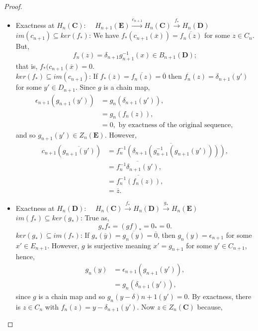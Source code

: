 \documentclass[11.5pt, twoside, a4paper, titlepage]{report}
\theoremstyle{definition}
\theoremstyle{plain}
\begin{document}
\begin{proof}
\begin{itemize}
\item Exactness at $H_n(\mathbf{C})$: $\quad H_{n+1}(\mathbf{E}) \xrightarrow{c_{n+1}} H_n(\mathbf{C})\xrightarrow{f_{\ast}}H_n(\mathbf{D})$\\
$im(c_{n+1})\subseteq ker(f_{\ast})$: We have $f_{\ast}(c_{n+1}(\overline{x}))=\overline{f_n(z)}$ for some $z\in C_n$. But,
\begin{equation*}
f_n(z)=\delta_{n+1}g^{-1}_{n+1}(x)\in B_{n+1}(\mathbf{D});
\end{equation*}
that is, $f_{\ast}(c_{n+1}(\overline{x})=0$.\\
$ker(f_{\ast})\subseteq im(c_{n+1})$: If $f_{\ast}(\overline{z})=\overline{f_n(z)}=\overline{0}$ then $f_n(z)=\delta_{n+1}(y')$ for some $y'\in D_{n+1}$. Since $g$ is a chain map,
\begin{align*}
\epsilon_{n+1}(g_{n+1}(y'))&=g_n(\delta_{n+1}(y')),\\
&=g_n(f_n(z)),\\
&=0, \text{ by exactness of the original sequence, }
\end{align*}
and so $g_{n+1}(y')\in Z_n(\mathbf{E})$. However,
\begin{align*}
c_{n+1}(\overline{g_{n+1}(y')})&=\overline{f^{-1}_n(\delta_{n+1}(g^{-1}_{n+1}(g_{n+1}(y'))))}, \\
&=\overline{f_n^{-1}\delta_{n+1}(y')}, \\
&=\overline{f_n^{-1}(f_n(z))}, \\
&=\overline{z}.
\end{align*}
\item Exactness at $H_n(\mathbf{D})$: $\quad H_n(\mathbf{C}) \xrightarrow{f_{\ast}} H_n(\mathbf{D}) \xrightarrow{g_{\ast}} H_n(\mathbf{E})$\\
$im(f_{\ast}) \subseteq ker(g_{\ast})$: True as,
\begin{equation*}
g_{\ast}f_{\ast}=(gf)_{\ast}=0_{\ast}=0.
\end{equation*}
$ker(g_{\ast})\subseteq im(f_{\ast})$: If $g_{\ast}(\overline{y})=\overline{g_n(y)}=\overline{0}$, then $g_n(y)=\epsilon_{n+1}$ for some $x'\in E_{n+1}$. However, $g$ is surjective meaning $x'=g_{n+1}$ for some $y'\in C_{n+1}$, hence, 
\begin{align*}
g_n(y)&=\epsilon_{n+1}(g_{n+1}(y')),\\
&=g_n(\delta_{n+1}(y')),
\end{align*} 
since $g$ is a chain map and so $ g_n(y-\delta){n+1}(y')=0$. By exactness, there is $z\in C_n$ with $f_n(z)=y-\delta_{n+1}(y')$. Now $z\in Z_n(\mathbf{C})$ because,

\end{itemize}
\end{proof}
\end{document}
